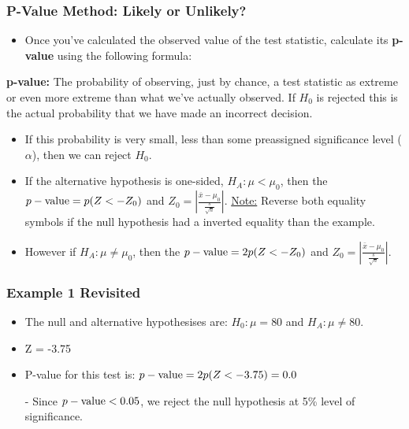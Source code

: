 \documentclass[12pt, letterpaper]{article}
\begin{document}
            \subsubsection{P-Value Method: Likely or Unlikely?}
                \begin{itemize}
                    \item Once you've calculated the observed value of the test statistic, calculate its \textbf{p-value} using the following formula:
                \end{itemize}
                \newpage\begin{mdframed}[leftmargin=0.5cm, rightmargin=0.5cm]
                    \textbf{p-value:} The probability of observing, just by chance, a test statistic as extreme or even more extreme than what we've actually observed. If $H_0$ is rejected this is the actual probability that we have made an incorrect decision.
                \end{mdframed}
                \begin{itemize}
                    \item If this probability is very small, less than some preassigned significance level ($\alpha$), then we can reject $H_0$.
                    \item If the alternative hypothesis is one-sided, $H_A : \mu < \mu_0$, then the $p-\textnormal{value} = p(Z < -Z_0)$ and $Z_0 = \left|\frac{\bar{x}-\mu_0}{\frac{s}{\sqrt{n}}}\right|$. \underline{Note:} Reverse both equality symbols if the null hypothesis had a inverted equality than the example.
                    \item However if $H_A : \mu \neq \mu_0$, then the $p-\textnormal{value} = 2p(Z < -Z_0)$ and $Z_0 = \left|\frac{\bar{x}-\mu_0}{\frac{s}{\sqrt{n}}}\right|$.
                \end{itemize}
            \subsubsection*{Example 1 Revisited}
                \begin{itemize}
                    \item The null and alternative hypothesises are: $H_0 : \mu = 80$ and $H_A : \mu \neq 80$.
                    \item Z = -3.75
                    \item P-value for this test is: $p-\textnormal{value} = 2p(Z < -3.75) = 0.0$
                    \item[-] Since $p-\textnormal{value} < 0.05$, we reject the null hypothesis at 5\% level of significance.
                \end{itemize}
\end{document}
